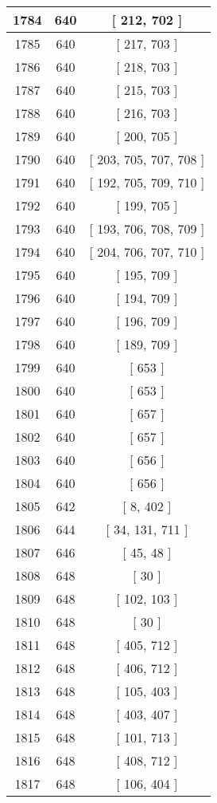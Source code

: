 \begin{center}
\begin{longtable}[H]{|| c c c ||}
\hline
1784 & 640 & [ 212, 702 ] \\ 
\hline
1785 & 640 & [ 217, 703 ] \\ 
\hline
1786 & 640 & [ 218, 703 ] \\ 
\hline
1787 & 640 & [ 215, 703 ] \\ 
\hline
1788 & 640 & [ 216, 703 ] \\ 
\hline
1789 & 640 & [ 200, 705 ] \\ 
\hline
1790 & 640 & [ 203, 705, 707, 708 ] \\ 
\hline
1791 & 640 & [ 192, 705, 709, 710 ] \\ 
\hline
1792 & 640 & [ 199, 705 ] \\ 
\hline
1793 & 640 & [ 193, 706, 708, 709 ] \\ 
\hline
1794 & 640 & [ 204, 706, 707, 710 ] \\ 
\hline
1795 & 640 & [ 195, 709 ] \\ 
\hline
1796 & 640 & [ 194, 709 ] \\ 
\hline
1797 & 640 & [ 196, 709 ] \\ 
\hline
1798 & 640 & [ 189, 709 ] \\ 
\hline
1799 & 640 & [ 653 ] \\ 
\hline
1800 & 640 & [ 653 ] \\ 
\hline
1801 & 640 & [ 657 ] \\ 
\hline
1802 & 640 & [ 657 ] \\ 
\hline
1803 & 640 & [ 656 ] \\ 
\hline
1804 & 640 & [ 656 ] \\ 
\hline
1805 & 642 & [ 8, 402 ] \\ 
\hline
1806 & 644 & [ 34, 131, 711 ] \\ 
\hline
1807 & 646 & [ 45, 48 ] \\ 
\hline
1808 & 648 & [ 30 ] \\ 
\hline
1809 & 648 & [ 102, 103 ] \\ 
\hline
1810 & 648 & [ 30 ] \\ 
\hline
1811 & 648 & [ 405, 712 ] \\ 
\hline
1812 & 648 & [ 406, 712 ] \\ 
\hline
1813 & 648 & [ 105, 403 ] \\ 
\hline
1814 & 648 & [ 403, 407 ] \\ 
\hline
1815 & 648 & [ 101, 713 ] \\ 
\hline
1816 & 648 & [ 408, 712 ] \\ 
\hline
1817 & 648 & [ 106, 404 ] \\ 

\end{longtable}
\end{center}
